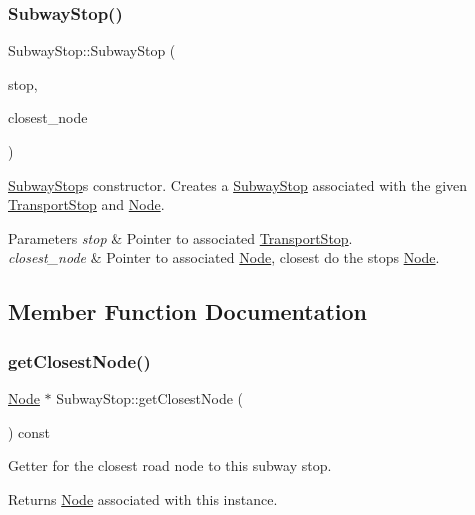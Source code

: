 \subsubsection{\texorpdfstring{Subway\+Stop()}{SubwayStop()}}
{\footnotesize\ttfamily Subway\+Stop\+::\+Subway\+Stop (\begin{DoxyParamCaption}\item[{\hyperlink{class_transport_stop}{Transport\+Stop} $\ast$}]{stop,  }\item[{\hyperlink{class_node}{Node} $\ast$}]{closest\+\_\+node }\end{DoxyParamCaption})}

\hyperlink{class_subway_stop}{Subway\+Stop}\textquotesingle{}s constructor. Creates a \hyperlink{class_subway_stop}{Subway\+Stop} associated with the given \hyperlink{class_transport_stop}{Transport\+Stop} and \hyperlink{class_node}{Node}.


\begin{DoxyParams}{Parameters}
{\em stop} & Pointer to associated \hyperlink{class_transport_stop}{Transport\+Stop}. \\
\hline
{\em closest\+\_\+node} & Pointer to associated \hyperlink{class_node}{Node}, closest do the stop\textquotesingle{}s \hyperlink{class_node}{Node}. \\
\hline
\end{DoxyParams}


\subsection{Member Function Documentation}
\hypertarget{class_subway_stop_a575f9f1c940378cb193b2690ad972cf8}{}\label{class_subway_stop_a575f9f1c940378cb193b2690ad972cf8} 
\subsubsection{\texorpdfstring{get\+Closest\+Node()}{getClosestNode()}}
{\footnotesize\ttfamily \hyperlink{class_node}{Node} $\ast$ Subway\+Stop\+::get\+Closest\+Node (\begin{DoxyParamCaption}{ }\end{DoxyParamCaption}) const}

Getter for the closest road node to this subway stop.

\begin{DoxyReturn}{Returns}
\hyperlink{class_node}{Node} associated with this instance. 
\end{DoxyReturn}
\hypertarget{class_subway_stop_a5cc277b4da7f0decf74518de16b2966b}{}\label{class_subway_stop_a5cc277b4da7f0decf74518de16b2966b} 
